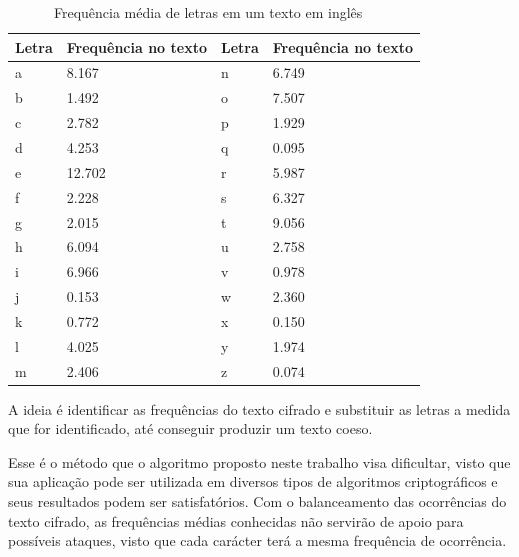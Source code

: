 \begin{table}[h]
\centering
\begin{tabular}{|l|l|l|l|}
	\hline
	Letra & Frequência no texto & Letra & Frequência no texto \\ \hline
	a & 8.167 & n & 6.749 \\ \hline
	b & 1.492 & o & 7.507 \\ \hline
	c & 2.782 & p & 1.929 \\ \hline
	d & 4.253 & q & 0.095 \\ \hline
	e & 12.702 & r & 5.987 \\ \hline
	f & 2.228 & s & 6.327 \\ \hline
	g & 2.015 & t & 9.056 \\ \hline
	h & 6.094 & u & 2.758 \\ \hline
	i & 6.966 & v & 0.978 \\ \hline
	j & 0.153 & w & 2.360 \\ \hline
	k & 0.772 & x & 0.150 \\ \hline
	l & 4.025 & y & 1.974 \\ \hline
	m & 2.406 & z & 0.074 \\ \hline
\end{tabular}
\caption[{Frequência média de letras em um texto em inglês}]{Frequência média de letras em um texto em inglês ~\cite{robert-lewand}} 
\end{table}

A ideia é identificar as frequências do texto cifrado e substituir as letras a medida que for identificado, até conseguir produzir um texto coeso.

Esse é o método que o algoritmo proposto neste trabalho visa dificultar, visto que sua aplicação pode ser utilizada em diversos tipos de algoritmos criptográficos e seus resultados podem ser satisfatórios. Com o balanceamento das ocorrências do texto cifrado, as frequências médias conhecidas não servirão de apoio para possíveis ataques, visto que cada carácter terá a mesma frequência de ocorrência.